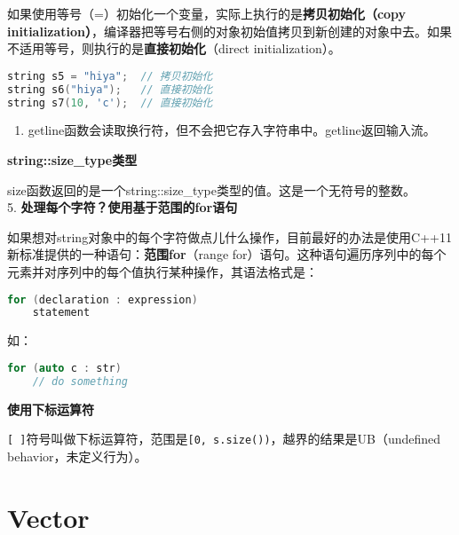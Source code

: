 \documentclass[
  a4paper,
  oneside,tablecaptionabove
]{scrbook}
\providecommand{\tightlist}{%
  \setlength{\itemsep}{0pt}\setlength{\parskip}{0pt}}
\begin{document}
如果使用等号（=）初始化一个变量，实际上执行的是\textbf{拷贝初始化（copy
initialization）}，编译器把等号右侧的对象初始值拷贝到新创建的对象中去。如果不适用等号，则执行的是\textbf{直接初始化}（direct
initialization）。

\begin{lstlisting}[language={C++}]
string s5 = "hiya";  // 拷贝初始化
string s6("hiya");   // 直接初始化
string s7(10, 'c');  // 直接初始化
\end{lstlisting}

\begin{enumerate}
\def\labelenumi{\arabic{enumi}.}
\setcounter{enumi}{3}
\tightlist
\item
  getline函数会读取换行符，但不会把它存入字符串中。getline返回输入流。
\end{enumerate}

\textbf{string::size\_type类型}

size函数返回的是一个string::size\_type类型的值。这是一个无符号的整数。\\
5. \textbf{处理每个字符？使用基于范围的for语句}

如果想对string对象中的每个字符做点儿什么操作，目前最好的办法是使用C++11新标准提供的一种语句：\textbf{范围for}（range
for）语句。这种语句遍历序列中的每个元素并对序列中的每个值执行某种操作，其语法格式是：

\begin{lstlisting}[language={C++}]
for (declaration : expression)
    statement
\end{lstlisting}

如：

\begin{lstlisting}[language={C++}]
for (auto c : str)
    // do something
\end{lstlisting}

\textbf{使用下标运算符}

\lstinline![ ]!符号叫做下标运算符，范围是\lstinline![0, s.size())!，越界的结果是UB（undefined
behavior，未定义行为）。

\section{Vector}\label{vector}
\end{document}

